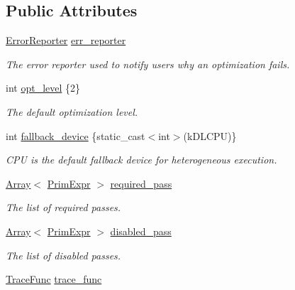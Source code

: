 \subsection*{Public Attributes}
\begin{DoxyCompactItemize}
\item 
\hyperlink{classtvm_1_1ErrorReporter}{Error\+Reporter} \hyperlink{classtvm_1_1transform_1_1PassContextNode_aaa3ce0ad4b706d1a38ea953e52941c12}{err\+\_\+reporter}
\begin{DoxyCompactList}\small\item\em The error reporter used to notify users why an optimization fails. \end{DoxyCompactList}\item 
int \hyperlink{classtvm_1_1transform_1_1PassContextNode_af166034a8746d65044eea0a2673de991}{opt\+\_\+level} \{2\}
\begin{DoxyCompactList}\small\item\em The default optimization level. \end{DoxyCompactList}\item 
int \hyperlink{classtvm_1_1transform_1_1PassContextNode_a0b98ed8aa5bbb660801a9608759a00a9}{fallback\+\_\+device} \{static\+\_\+cast$<$int$>$(k\+D\+L\+C\+PU)\}
\begin{DoxyCompactList}\small\item\em C\+PU is the default fallback device for heterogeneous execution. \end{DoxyCompactList}\item 
\hyperlink{classtvm_1_1Array}{Array}$<$ \hyperlink{classtvm_1_1PrimExpr}{Prim\+Expr} $>$ \hyperlink{classtvm_1_1transform_1_1PassContextNode_ac8928bc4c5bfe3a1b2c7805da35f707a}{required\+\_\+pass}
\begin{DoxyCompactList}\small\item\em The list of required passes. \end{DoxyCompactList}\item 
\hyperlink{classtvm_1_1Array}{Array}$<$ \hyperlink{classtvm_1_1PrimExpr}{Prim\+Expr} $>$ \hyperlink{classtvm_1_1transform_1_1PassContextNode_ada6069e057832107b112acfd7df1383a}{disabled\+\_\+pass}
\begin{DoxyCompactList}\small\item\em The list of disabled passes. \end{DoxyCompactList}\item 
\hyperlink{namespacetvm_1_1transform_a0904052a95bd90a669cba07770694652}{Trace\+Func} \hyperlink{classtvm_1_1transform_1_1PassContextNode_a84242480dd92b11637881d8313524481}{trace\+\_\+func}
\end{DoxyCompactItemize}
